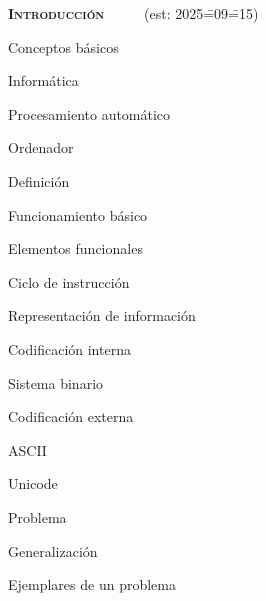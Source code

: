 \begin{longenum}
    \item \textbf{\textsc{Introducción}} \ \ \ \ \ (est: 2025\==09\==15)
    \begin{longenum}
        \item Conceptos básicos
        \begin{longenum}
            \item Informática
            \begin{longenum}
                \item Procesamiento automático
            \end{longenum}
            \item Ordenador
            \begin{longenum}
                \item Definición
                \item Funcionamiento básico
                \begin{longenum}
                    \item Elementos funcionales
                    \item Ciclo de instrucción
                    \item Representación de información
                    \begin{longenum}
                        \item Codificación interna
                        \begin{longenum}
                            \item Sistema binario
                        \end{longenum}
                        \item Codificación externa
                        \begin{longenum}
                            \item ASCII
                            \item Unicode
                        \end{longenum}
                    \end{longenum}
                \end{longenum}
            \end{longenum}
            \item Problema
            \begin{longenum}
                \item Generalización
                \item Ejemplares de un problema

\end{longenum}
\end{longenum}
\end{longenum}
\end{longenum}
